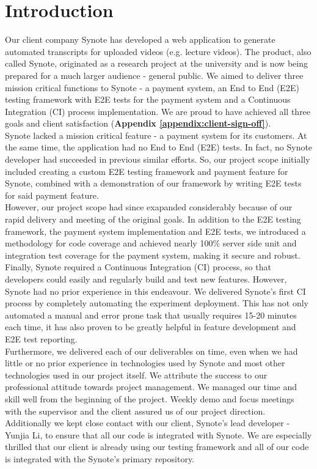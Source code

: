 \chapter{Introduction}
\label{chap:introduction}

Our client company Synote has developed a web application to generate automated transcripts for uploaded videos (e.g. lecture videos). The product, also called Synote, originated as a research project at the university and is now being prepared for a much larger audience - general public. We aimed to deliver three mission critical functions to Synote - a payment system, an End to End (E2E) testing framework with E2E tests for the payment system and a Continuous Integration (CI) process implementation. We are proud to have achieved all three goals and client satisfaction (\textbf{Appendix \ref{appendix:client-sign-off}}).\\

Synote lacked a mission critical feature - a payment system for its customers. At the same time, the application had no End to End (E2E) tests. In fact, no Synote developer had succeeded in previous similar efforts. So, our project scope initially included creating a custom E2E testing framework and payment feature for Synote, combined with a demonstration of our framework by writing E2E tests for said payment feature.\\

However, our project scope had since exapanded considerably because of our rapid delivery and meeting of the original goals. In addition to the E2E testing framework, the payment system implementation and E2E tests, we introduced a methodology for code coverage and achieved nearly 100\% server side unit and integration test coverage for the payment system, making it secure and robust.\\

Finally, Synote required a Continuous Integration (CI) process, so that developers could easily and regularly build and test new features. However, Synote had no prior experience in this endeavour. We delivered Synote's first CI process by completely automating the experiment deployment. This has not only automated a manual and error prone task that usually requires 15-20 minutes each time, it has also proven to be greatly helpful in feature development and E2E test reporting.\\

Furthermore, we delivered each of our deliverables on time, even when we had little or no prior experience in technologies used by Synote and most other technologies used in our project itself. We attribute the success to our professional attitude towards project management. We managed our time and skill well from the beginning of the project. Weekly demo and focus meetings with the supervisor and the client assured us of our project direction. Additionally we kept close contact with our client, Synote's lead developer - Yunjia Li, to ensure that all our code is integrated with Synote. We are especially thrilled that our client is already using our testing framework and all of our code is integrated with the Synote's primary repository.\\

